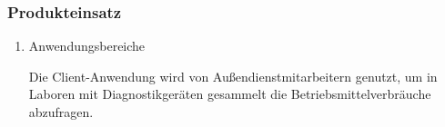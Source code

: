 \subsubsection*{Produkteinsatz}
\begin{enumerate}[itemsep=0em,partopsep=0em,parsep=0em,topsep=0em]
	\item Anwendungsbereiche

	Die Client-Anwendung wird von Außendienstmitarbeitern genutzt, um in Laboren mit {\betriebNameKzf} Diagnostikgeräten gesammelt die Betriebsmittelverbräuche abzufragen.
\end{enumerate}